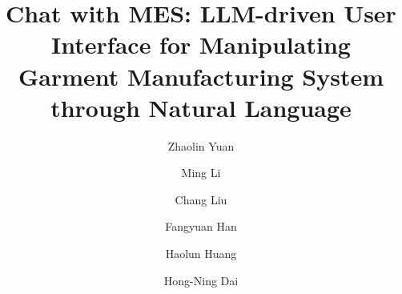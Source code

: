 \documentclass[preprint,12pt]{elsarticle}
\begin{document}
\begin{frontmatter}



\title{
Chat with MES: LLM-driven User Interface for Manipulating Garment Manufacturing System through Natural Language
}


\author[ustb,ise]{Zhaolin Yuan} %
\author[ise,riam,rcdt,transgp]{Ming Li} %
\author[ustb]{Chang Liu} %
\author[ustb]{Fangyuan Han} %
\author[jnu]{Haolun Huang} %
\author[hkbt]{Hong-Ning Dai} %



\end{frontmatter}
\end{document}
